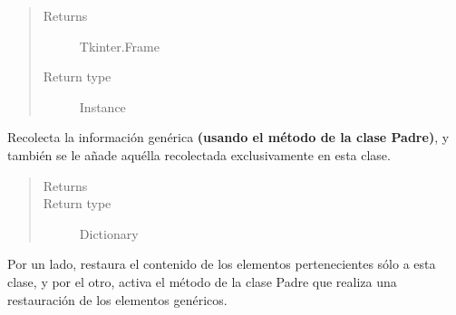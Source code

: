 \documentclass[letterpaper,10pt,english]{sphinxmanual}
\begin{document}
\begin{fulllineitems}
\begin{quote}
\begin{description}
\begin{itemize}
\end{itemize}

\item[{Returns}] \leavevmode
Tkinter.Frame

\item[{Return type}] \leavevmode
Instance

\end{description}\end{quote}

\begin{fulllineitems}
\label{View/Main/Population/TemplatePopulation/PopulaceFrame:View.Main.Population.PopulaceFrame.PopulaceFrame.get_information}
Recolecta la información genérica \textbf{(usando el método de la clase Padre)}, y también
se le añade aquélla recolectada exclusivamente en esta clase.
\begin{quote}\begin{description}
\item[{Returns}] \leavevmode



\item[{Return type}] \leavevmode
Dictionary

\end{description}\end{quote}

\end{fulllineitems}


\begin{fulllineitems}
\label{View/Main/Population/TemplatePopulation/PopulaceFrame:View.Main.Population.PopulaceFrame.PopulaceFrame.restore_settings}
Por un lado, restaura el contenido de los elementos pertenecientes sólo 
a esta clase, y por el otro, activa el método de la clase Padre que realiza
una restauración de los elementos genéricos.

\end{fulllineitems}


\end{fulllineitems}
\end{document}
